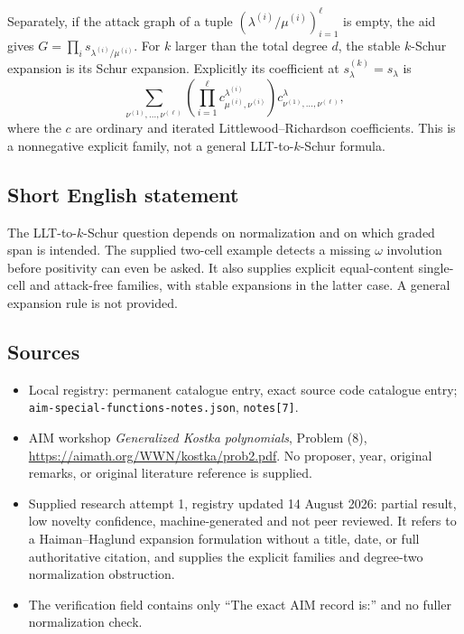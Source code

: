 \documentclass[11pt]{article}
\begin{document}
Separately, if the attack graph of a tuple $(\lambda^{(i)}/\mu^{(i)})_{i=1}^\ell$ is empty, the aid gives $G=\prod_i s_{\lambda^{(i)}/\mu^{(i)}}$. For $k$ larger than the total degree $d$, the stable $k$-Schur expansion is its Schur expansion. Explicitly its coefficient at $s^{(k)}_\lambda=s_\lambda$ is
\[
\sum_{\nu^{(1)},\ldots,\nu^{(\ell)}}
\left(\prod_{i=1}^\ell c^{\lambda^{(i)}}_{\mu^{(i)},\nu^{(i)}}\right)c^\lambda_{\nu^{(1)},\ldots,\nu^{(\ell)}},
\]
where the $c$ are ordinary and iterated Littlewood--Richardson coefficients. This is a nonnegative explicit family, not a general LLT-to-$k$-Schur formula.
\subsection{Short English statement}
The LLT-to-$k$-Schur question depends on normalization and on which graded span is intended. The supplied two-cell example detects a missing $\omega$ involution before positivity can even be asked. It also supplies explicit equal-content single-cell and attack-free families, with stable expansions in the latter case. A general expansion rule is not provided.
\subsection{Sources}
\begin{itemize}
\item Local registry: permanent catalogue entry, exact source code catalogue entry; \texttt{aim-special-functions-notes.json}, \texttt{notes[7]}.
\item AIM workshop \emph{Generalized Kostka polynomials}, Problem (8), \url{https://aimath.org/WWN/kostka/prob2.pdf}. No proposer, year, original remarks, or original literature reference is supplied.
\item Supplied research attempt 1, registry updated 14 August 2026: partial result, low novelty confidence, machine-generated and not peer reviewed. It refers to a Haiman--Haglund expansion formulation without a title, date, or full authoritative citation, and supplies the explicit families and degree-two normalization obstruction.
\item The verification field contains only ``The exact AIM record is:'' and no fuller normalization check.
\end{itemize}
\end{document}
